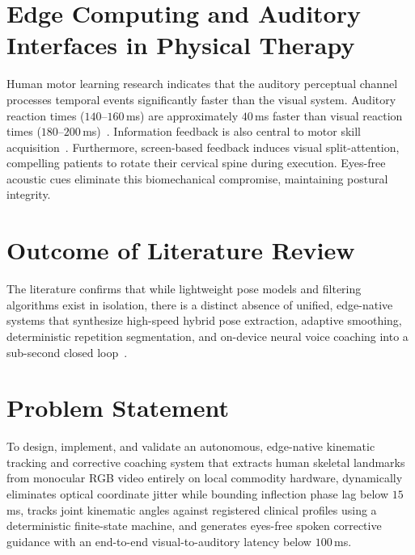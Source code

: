 \documentclass[12pt]{report}
\begin{document}
\section{Edge Computing and Auditory Interfaces in Physical Therapy}
Human motor learning research indicates that the auditory perceptual channel processes temporal events significantly faster than the visual system. Auditory reaction times ($140\text{--}160$\,ms) are approximately $40$\,ms faster than visual reaction times ($180\text{--}200$\,ms)~\cite{sigrist2013augmented}. Information feedback is also central to motor skill acquisition~\cite{swinnen1997information}. Furthermore, screen-based feedback induces visual split-attention, compelling patients to rotate their cervical spine during execution. Eyes-free acoustic cues eliminate this biomechanical compromise, maintaining postural integrity.

\section{Outcome of Literature Review}
The literature confirms that while lightweight pose models and filtering algorithms exist in isolation, there is a distinct absence of unified, edge-native systems that synthesize high-speed hybrid pose extraction, adaptive smoothing, deterministic repetition segmentation, and on-device neural voice coaching into a sub-second closed loop~\cite{bazarevsky2020blazepose, casiez2012euro, sigrist2013augmented}.

\section{Problem Statement}
To design, implement, and validate an autonomous, edge-native kinematic tracking and corrective coaching system that extracts human skeletal landmarks from monocular RGB video entirely on local commodity hardware, dynamically eliminates optical coordinate jitter while bounding inflection phase lag below $15$\,ms, tracks joint kinematic angles against registered clinical profiles using a deterministic finite-state machine, and generates eyes-free spoken corrective guidance with an end-to-end visual-to-auditory latency below $100$\,ms.
\end{document}

